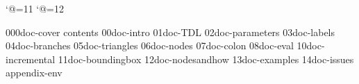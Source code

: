 









\sstitles


\catcode`@=11
\let\ling@getpars=\@getoptionalarg
\let\pst@pars=\@optionalarg
\catcode`@=12


\get 000doc-cover
\get contents
\get 00doc-intro
\get 01doc-TDL
\get 02doc-parameters
\get 03doc-labels
\get 04doc-branches
\get 05doc-triangles
\get 06doc-nodes
\get 07doc-colon
\get 08doc-eval
\get 10doc-incremental
\get 11doc-boundingbox
\get 12doc-nodesandhow
\get 13doc-examples
\get 14doc-issues
%
\get appendix-env
  \bye
%



\bye


